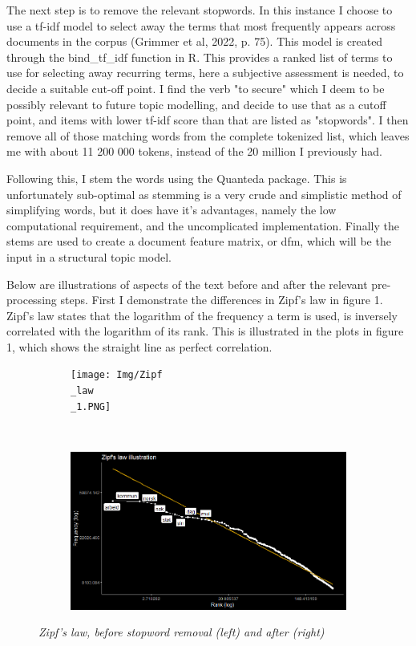 \documentclass[12pt]{article}
\begin{document}
	The next step is to remove the relevant stopwords. In this instance I choose to use a tf-idf model to select away the terms that most frequently appears across documents in the corpus (Grimmer et al, 2022, p. 75). This model is created through the bind\_tf\_idf function in R. This provides a ranked list of terms to use for selecting away recurring terms, here a subjective assessment is needed, to decide a suitable cut-off point. I find the verb "to secure" which I deem to be possibly relevant to future topic modelling, and decide to use that as a cutoff point, and items with lower tf-idf score than that are listed as "stopwords". I then remove all of those matching words from the complete tokenized list, which leaves me with about 11 200 000 tokens, instead of the 20 million I previously had. 
	
	Following this, I stem the words using the Quanteda package. This is unfortunately sub-optimal as stemming is a very crude and simplistic method of simplifying words, but it does have it's advantages, namely the low computational requirement, and the uncomplicated implementation. Finally the stems are used to create a document feature matrix, or dfm, which will be the input in a structural topic model.
	
	Below are illustrations of aspects of the text before and after the relevant pre-processing steps. First I demonstrate the differences in Zipf's law in figure 1. Zipf's law states that the logarithm of the frequency a term is used, is inversely correlated with the logarithm of its rank. This is illustrated in the plots in figure 1, which shows the straight line as perfect correlation.
	
	\begin{figure}[h]
		\begin{subfigure}[b]{0.3\linewidth}
			\texttt{[image: Img/Zipf\\\_law\\\_1.PNG]}
		\end{subfigure}\hspace{3cm}%
		~  
		\begin{subfigure}[b]{0.3\linewidth}
			\includegraphics[scale=0.40]{Img/ziplaw2.PNG}
		\end{subfigure}
	\caption{\textit{Zipf's law, before stopword removal (left) and after (right)}}
	\end{figure}
	
\end{document}
